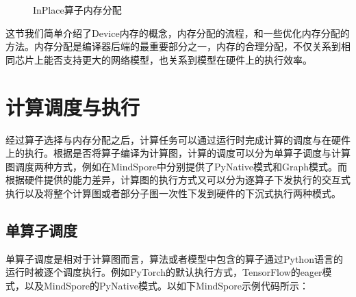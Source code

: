 \documentclass[letterpaper,10pt,english]{sphinxmanual}
\let\sphinxpxdimen\pdfpxdimen\else\newdimen\sphinxpxdimen
\begin{document}
\begin{figure}[H]
\centering
\capstart

\noindent\sphinxincludegraphics[width=800\sphinxpxdimen]{{inplace-op}.png}
\caption{In\sphinxhyphen{}Place算子内存分配}\label{\detokenize{chapter_backend_and_runtime/memory_allocator:id12}}\label{\detokenize{chapter_backend_and_runtime/memory_allocator:inplace-op}}\end{figure}

\sphinxAtStartPar
这节我们简单介绍了Device内存的概念，内存分配的流程，和一些优化内存分配的方法。内存分配是编译器后端的最重要部分之一，内存的合理分配，不仅关系到相同芯片上能否支持更大的网络模型，也关系到模型在硬件上的执行效率。


\section{计算调度与执行}
\label{\detokenize{chapter_backend_and_runtime/compute_schedule_and_execute:id1}}\label{\detokenize{chapter_backend_and_runtime/compute_schedule_and_execute::doc}}
\sphinxAtStartPar
经过算子选择与内存分配之后，计算任务可以通过运行时完成计算的调度与在硬件上的执行。根据是否将算子编译为计算图，计算的调度可以分为单算子调度与计算图调度两种方式，例如在MindSpore中分别提供了PyNative模式和Graph模式。而根据硬件提供的能力差异，计算图的执行方式又可以分为逐算子下发执行的交互式执行以及将整个计算图或者部分子图一次性下发到硬件的下沉式执行两种模式。


\subsection{单算子调度}
\label{\detokenize{chapter_backend_and_runtime/compute_schedule_and_execute:id2}}
\sphinxAtStartPar
单算子调度是相对于计算图而言，算法或者模型中包含的算子通过Python语言的运行时被逐个调度执行。例如PyTorch的默认执行方式，TensorFlow的eager模式，以及MindSpore的PyNative模式。以如下MindSpore示例代码所示：
\end{document}
